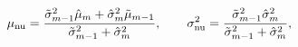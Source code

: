 \begin{equation}
  \mu_{\text{nu}} = \frac{
    \tilde{\sigma}^{2}_{m - 1} \hat{\mu}_{m} + \hat{\sigma}^{2}_{m}\tilde{\mu}_{m - 1}
  } {
    \tilde{\sigma}^{2}_{m - 1} + \hat{\sigma}^{2}_{m}
  },
  \qquad
  \sigma^{2}_{\text{nu}} = \frac{
    \tilde{\sigma}^{2}_{m - 1} \hat{\sigma}^{2}_{m}
  } {
    \tilde{\sigma}^{2}_{m - 1} + \hat{\sigma}^{2}_{m}
  },
  \label{eqn:numerator-results}
\end{equation}